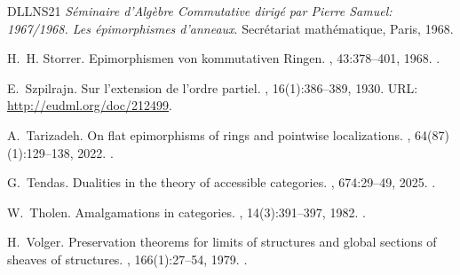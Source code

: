 \documentclass[a4paper,10pt,reqno]{amsart}
\theoremstyle{definition}
\theoremstyle{remark}
\begin{document}
\begin{thebibliography}{DLLNS21}
  {\em S\'eminaire d'{A}lg\`ebre {C}ommutative dirig\'e{} par {P}ierre {S}amuel: 1967/1968. {L}es \'epimorphismes d'anneaux}.
  \newblock Secr\'etariat math\'ematique, Paris, 1968.
  
  H.~H. Storrer.
  \newblock Epimorphismen von kommutativen {R}ingen.
  , 43:378--401, 1968.
  \newblock \href {https://doi.org/10.1007/BF02564404} {}.
  
  E.~Szpilrajn.
  \newblock Sur l'extension de l'ordre partiel.
  , 16(1):386--389, 1930.
  \newblock URL: \url{http://eudml.org/doc/212499}.
  
  A.~Tarizadeh.
  \newblock On flat epimorphisms of rings and pointwise localizations.
  , 64(87)(1):129--138, 2022.
  \newblock \href {https://doi.org/10.24193/mathcluj.2022.1.14} {}.
  
  G.~Tendas.
  \newblock Dualities in the theory of accessible categories.
  , 674:29--49, 2025.
  \newblock \href {https://doi.org/10.1016/j.jalgebra.2025.03.012} {}.
  
  W.~Tholen.
  \newblock Amalgamations in categories.
  , 14(3):391--397, 1982.
  \newblock \href {https://doi.org/10.1007/BF02483940} {}.
  
  H.~Volger.
  \newblock Preservation theorems for limits of structures and global sections of sheaves of structures.
  , 166(1):27--54, 1979.
  \newblock \href {https://doi.org/10.1007/BF01173845} {}.
  
  \end{thebibliography}
  
\end{document}
